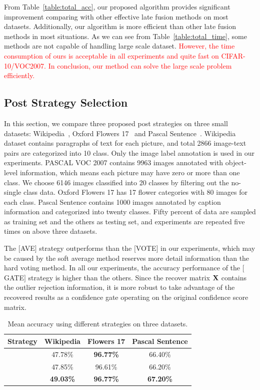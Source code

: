 \documentclass[10pt,twocolumn,letterpaper]{article}
\def\bX{{\bf X}}
\def\bX{{\bf X}}
\def\yanred{\textcolor{red}}
\begin{document}
From Table~\ref{table:total_acc}, our proposed algorithm provides significant improvement comparing with other effective late fusion methods on most datasets.
Additionally, our algorithm is more efficient than other late fusion methods in most situations.
As we can see from Table~\ref{table:total_time}, some methods are not capable of handling large scale dataset.
\yanred{
However, the time consumption of ours is acceptable in all experiments and quite fast on CIFAR-10/VOC2007.
In conclusion, our method can solve the large scale problem efficiently.
}

\subsection{Post Strategy Selection}

In this section, we compare three proposed post strategies on three small datasets: Wikipedia~\cite{rasiwasia2010new}, Oxford Flowers 17~\cite{nilsback2006visual} and Pascal Sentence~\cite{Li2006One}.
Wikipedia dataset contains paragraphs of text for each picture, and total 2866 image-text pairs are categorized into 10 class.
Only the image label annotation is used in our experiments.
PASCAL VOC 2007 contains 9963 images annotated with object-level information, which means each picture may have zero or more than one class.
We choose 6146 images classified into 20 classes by filtering out the no-single class data.
Oxford Flowers 17 has 17 flower categories with 80 images for each class.
Pascal Sentence contains 1000 images annotated by caption information and categorized into twenty classes.
Fifty percent of data are sampled as training set and the others as testing set, and experiments are repeated five times on above three datasets.

The $[$AVE$]$ strategy outperforms than the $[$VOTE$]$ in our experiments, which may be caused by the soft average method reserves more detail information than the hard voting method.
In all our experiments, the accuracy performance of the $[$GATE$]$ strategy is higher than the others.
Since the recover matrix $\bX$ contains the outlier rejection information,
it is more robust to take advantage of the recovered results as a confidence gate operating on the original confidence score matrix.

\begin{table}[ht]
\centering
\begin{tabular}{|c|c|c|c|}
\hline
Strategy            & Wikipedia         & Flowers 17          & Pascal Sentence     \\\hline
[AVE]               & 47.78\%           & \textbf{96.77\%}    & 66.40\%             \\\hline
[VOTE]              & 47.85\%           & 96.61\%             & 66.20\%             \\\hline
[GATE]              & \textbf{49.03\%}  & \textbf{96.77\%}    & \textbf{67.20\%}    \\
\hline
\end{tabular}
\caption{Mean accuracy using different strategies on three datasets.}
\label{table:strategy}
\end{table}
\end{document}
